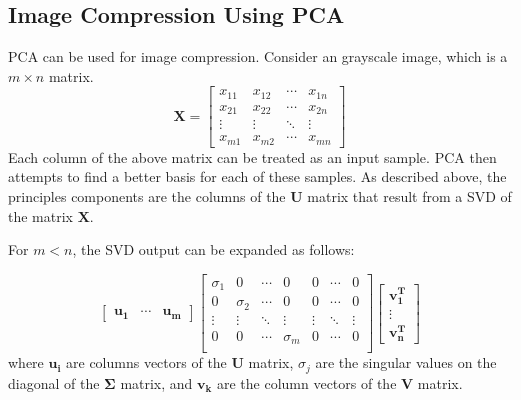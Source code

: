 \documentclass[conference]{IEEEtran}
\begin{document}
    \subsection{Image Compression Using PCA} \label{pca_section}
    	
    	PCA can be used for image compression. Consider an grayscale image, which is a $m \times n$ matrix. 
    	\begin{equation}
    		\mathbf{X} = \begin{bmatrix}
    			x_{11} & x_{12} & \cdots & x_{1n} \\
    			x_{21} & x_{22} & \cdots & x_{2n} \\
    			\vdots & \vdots & \ddots & \vdots \\
    			x_{m1} & x_{m2} & \cdots & x_{mn}
    		\end{bmatrix}    			
    	\end{equation}
    Each column of the above matrix can be treated as an input sample. PCA then attempts to find a better basis for each of these samples. As described above, the principles components are the columns of the $\mathbf{U}$ matrix that result from a SVD of the matrix $\mathbf{X}$.
	
    For $m < n$, the SVD output can be expanded as follows:
	
	\begin{equation}
		\begin{bmatrix}
			\mathbf{u_1} & \cdots & \mathbf{u_m}
		\end{bmatrix}\begin{bmatrix}
			\sigma_1 & 0 & \cdots & 0 & 0 & \cdots & 0\\
			0 & \sigma_2 & \cdots & 0 & 0 & \cdots & 0\\
			\vdots & \vdots & \ddots & \vdots & \vdots & \ddots & \vdots\\
			0 & 0 & \cdots & \sigma_m & 0 & \cdots & 0\\		
		\end{bmatrix}\begin{bmatrix}
			\mathbf{v_{1}^{T}}\\
			\vdots\\
			\mathbf{v_{n}^{T}}
		\end{bmatrix}		
	\end{equation}
    where $\mathbf{u_i}$ are columns vectors of the $\mathbf{U}$ matrix, $\sigma_j$ are the singular values on the diagonal of the $\mathbf{\Sigma}$ matrix, and $\mathbf{v_k}$ are the column vectors of the $\mathbf{V}$ matrix.
	  
\end{document}

